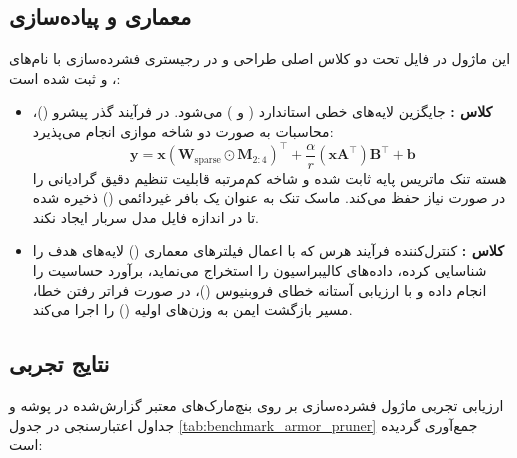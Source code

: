 \subsection{معماری و پیاده‌سازی}
این ماژول در فایل  تحت دو کلاس اصلی طراحی و در رجیستری فشرده‌سازی با نام‌های ،  و  ثبت شده است:
\begin{itemize}
    \item \textbf{کلاس :} جایگزین لایه‌های خطی استاندارد ( و ) می‌شود. در فرآیند گذر پیشرو ()، محاسبات به صورت دو شاخه موازی انجام می‌پذیرد:
    \begin{equation}
    \mathbf{y} = \mathbf{x} (\mathbf{W}_{\text{sparse}} \odot \mathbf{M}_{2:4})^\top + \frac{\alpha}{r} (\mathbf{x} \mathbf{A}^\top) \mathbf{B}^\top + \mathbf{b}
    \end{equation}
    هسته تنک ماتریس پایه ثابت شده و شاخه کم‌مرتبه قابلیت تنظیم دقیق گرادیانی را در صورت نیاز حفظ می‌کند. ماسک تنک به عنوان یک بافر غیردائمی () ذخیره شده تا در اندازه فایل مدل سربار ایجاد نکند.
    \item \textbf{کلاس :} کنترل‌کننده فرآیند هرس که با اعمال فیلترهای معماری () لایه‌های هدف را شناسایی کرده، داده‌های کالیبراسیون را استخراج می‌نماید، برآورد حساسیت را انجام داده و با ارزیابی آستانه خطای فروبنیوس ()، در صورت فراتر رفتن خطا، مسیر بازگشت ایمن به وزن‌های اولیه () را اجرا می‌کند.
\end{itemize}

\subsection{نتایج تجربی}
ارزیابی تجربی ماژول فشرده‌سازی  بر روی بنچ‌مارک‌های معتبر گزارش‌شده در پوشه  و جداول اعتبارسنجی در جدول \ref{tab:benchmark_armor_pruner} جمع‌آوری گردیده است:

